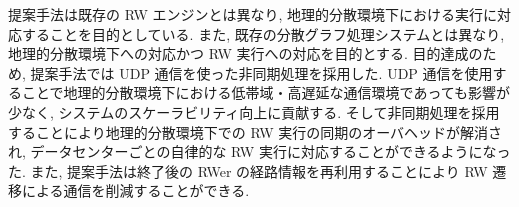 提案手法は既存の RW エンジンとは異なり, 地理的分散環境下における実行に対応することを目的としている. また, 既存の分散グラフ処理システムとは異なり, 地理的分散環境下への対応かつ RW 実行への対応を目的とする. 目的達成のため, 提案手法では UDP 通信を使った非同期処理を採用した. UDP 通信を使用することで地理的分散環境下における低帯域・高遅延な通信環境であっても影響が少なく, システムのスケーラビリティ向上に貢献する. そして非同期処理を採用することにより地理的分散環境下での RW 実行の同期のオーバヘッドが解消され, データセンターごとの自律的な RW 実行に対応することができるようになった. また, 提案手法は終了後の RWer の経路情報を再利用することにより RW 遷移による通信を削減することができる. 